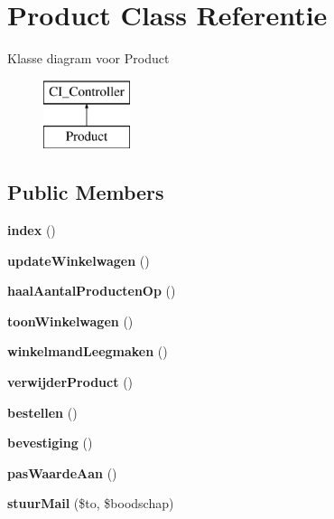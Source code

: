 \hypertarget{class_product}{}\section{Product Class Referentie}
\label{class_product}
Klasse diagram voor Product\begin{figure}[H]
\begin{center}
\leavevmode
\includegraphics[height=2.000000cm]{class_product}
\end{center}
\end{figure}
\subsection*{Public Members}
\begin{DoxyCompactItemize}
\item 
\mbox{\label{class_product_a149eb92716c1084a935e04a8d95f7347}} 
{\bfseries index} ()
\item 
\mbox{\label{class_product_aed65d948df5d4f6e065f2a00d23abef3}} 
{\bfseries update\+Winkelwagen} ()
\item 
\mbox{\label{class_product_ac2deeffeea9ffb6cfaa471cb4929c56d}} 
{\bfseries haal\+Aantal\+Producten\+Op} ()
\item 
\mbox{\label{class_product_a0b9d1fd12c6620a3a87693777bc5269e}} 
{\bfseries toon\+Winkelwagen} ()
\item 
\mbox{\label{class_product_a6aa8db45d3af97d328e5c0e8f477d3fd}} 
{\bfseries winkelmand\+Leegmaken} ()
\item 
\mbox{\label{class_product_a7311f17ff3747295b3e494f3c043e47c}} 
{\bfseries verwijder\+Product} ()
\item 
\mbox{\label{class_product_abaa8cecbfebc6d676d9c7b25db3c3257}} 
{\bfseries bestellen} ()
\item 
\mbox{\label{class_product_a5f31bd69d732456a673e8ece8edd8933}} 
{\bfseries bevestiging} ()
\item 
\mbox{\label{class_product_a083d276dd700c10ba6447f0bb6e0c743}} 
{\bfseries pas\+Waarde\+Aan} ()
\item 
\mbox{\label{class_product_a85794c1504032a0ac766ef6504845d2d}} 
{\bfseries stuur\+Mail} (\$to, \$boodschap)
\end{DoxyCompactItemize}
